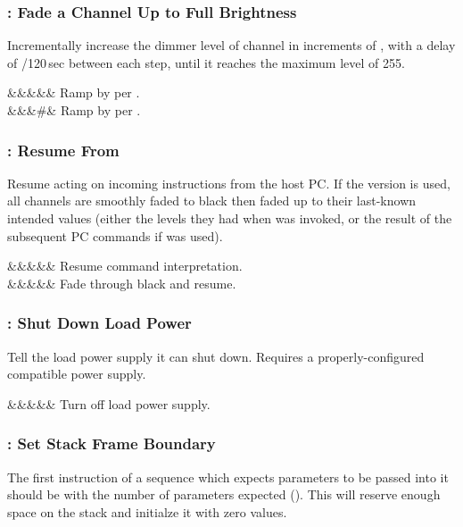 \documentclass[letterpaper,twoside,onecolumn,openright,final]{memoir}
\begin{document}
{\subsubsection{: Fade a Channel Up to Full Brightness}
Incrementally increase the dimmer level of channel  in increments of , with a delay
of /120\,sec between each step, until it reaches the maximum level of 255.

\begin{opdesc}
   &&&&\z{\$,\$,\$}& Ramp  by  per .\\
   &&&\z\#\z{,\#}\z{,\#}& Ramp  by  per .\\
\end{opdesc}

\subsubsection{: Resume From }
Resume acting on incoming instructions from the host PC.
If the  version is used, all channels are smoothly faded to
black then faded up to their last-known intended values (either the levels
they had when  was invoked, or the result of the subsequent
PC commands if  was used).

\begin{opdesc}
   &&&&& Resume command interpretation.\\
   &&&&& Fade through black and resume.
\end{opdesc}

\subsubsection{: Shut Down Load Power}
Tell the load power supply it can shut down.  Requires a properly-configured
compatible power supply.

\begin{opdesc}
   &&&&& Turn off load power supply.
\end{opdesc}

\subsubsection{: Set Stack Frame Boundary}
The first instruction of a sequence which expects parameters to be passed into it
should be  with the number of parameters expected ().  This will reserve enough
space on the stack and initialze it with zero values.

}
\end{document}
